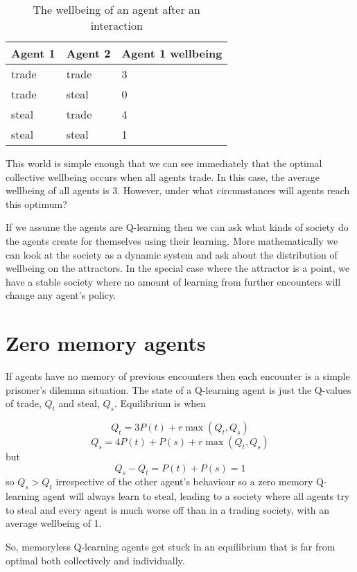 \documentclass[a4paper]{report}
\begin{document}
\begin{table}
\begin{center}
\begin{tabular}{lll}
Agent 1  & Agent 2 & Agent 1 wellbeing \\
\hline
trade & trade & 3 \\
trade & steal  & 0 \\
steal & trade & 4 \\
steal & steal & 1 \\
\hline
\end{tabular}
\end{center}
\caption{The wellbeing of an agent after an interaction}
\label{prisonersdilemmareward}
\end{table}

This world is simple enough that we can see immediately that the optimal collective wellbeing occurs when all agents trade. In this case, the average wellbeing of all agents is 3. However, under what circumstances will agents reach this optimum?

If we assume the agents are Q-learning then we can ask what kinds of society do the agents create for themselves using their learning. More mathematically we can look at the society as a dynamic system and ask about the distribution of wellbeing on the attractors. In the special case where the attractor is a point, we have a stable society where no amount of learning from further encounters will change any agent's policy.

\section{Zero memory agents}

If agents have no memory of previous encounters then each encounter is a simple prisoner's dilemma situation. The state of a Q-learning agent is just the Q-values of trade, $Q_t$ and steal, $Q_s$. Equilibrium is when
 
\[
Q_t = 3P(t) + r\max(Q_t, Q_s)
\]
\[
Q_s = 4P(t) + P(s) + r\max(Q_t, Q_s)
\]
but
\[
Q_s - Q_t = P(t) + P(s) = 1
\]
so $Q_s > Q_t$ irrespective of the other agent's behaviour so a zero memory Q-learning agent will always learn to steal, leading to a society where all agents try to steal and every agent is much worse off than in a trading society, with an average wellbeing of 1.

So, memoryless Q-learning agents get stuck in an equilibrium that is far from optimal both collectively and individually.
\end{document}
